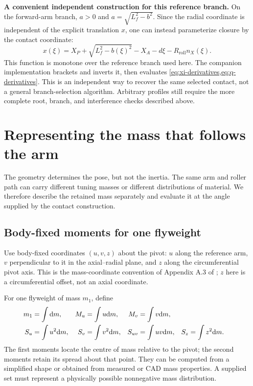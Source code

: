 \documentclass[11pt,letterpaper]{article}
\numberwithin{equation}{section}
\newcommand{\dd}{\mathrm{d}}
\newcommand{\term}[1]{\par\needspace{4\baselineskip}\textbf{#1}\enspace}
\begin{document}
\term{A convenient independent construction for this reference branch.}
On the forward-arm branch, $a>0$ and $a=\sqrt{L_f^2-b^2}$. Since the radial coordinate is independent of the explicit translation $x$, one can instead parameterize closure by the contact coordinate:
\begin{equation}
  x(\xi)=X_P+\sqrt{L_f^2-b(\xi)^2}
                -X_A-d\xi-R_{\mathrm{roll}}n_X(\xi).
  \label{eq:inverse-branch}
\end{equation}
This function is monotone over the reference branch used here. The companion implementation brackets and inverts it, then evaluates \cref{eq:xi-derivatives,eq:q-derivatives}. This is an independent way to recover the same selected contact, not a general branch-selection algorithm. Arbitrary profiles still require the more complete root, branch, and interference checks described above.

\section{Representing the mass that follows the arm}
\label{sec:mass}

The geometry determines the pose, but not the inertia. The same arm and roller path can carry different tuning masses or different distributions of material. We therefore describe the retained mass separately and evaluate it at the angle supplied by the contact construction.

\subsection{Body-fixed moments for one flyweight}

Use body-fixed coordinates $(u,v,z)$ about the pivot: $u$ along the reference arm, $v$ perpendicular to it in the axial--radial plane, and $z$ along the circumferential pivot axis. This is the mass-coordinate convention of Appendix A.3 of \cite{formulation}; $z$ here is a circumferential offset, not an axial coordinate.

For one flyweight of mass $m_1$, define
\begin{align}
  m_1&=\int\dd m,&
  M_u&=\int u\dd m,& M_v&=\int v\dd m,\notag\\
  S_u&=\int u^2\dd m,&
  S_v&=\int v^2\dd m,& S_{uv}&=\int uv\dd m,&
  S_z&=\int z^2\dd m.
  \label{eq:moments}
\end{align}
The first moments locate the centre of mass relative to the pivot; the second moments retain its spread about that point. They can be computed from a simplified shape or obtained from measured or CAD mass properties. A supplied set must represent a physically possible nonnegative mass distribution.
\end{document}
